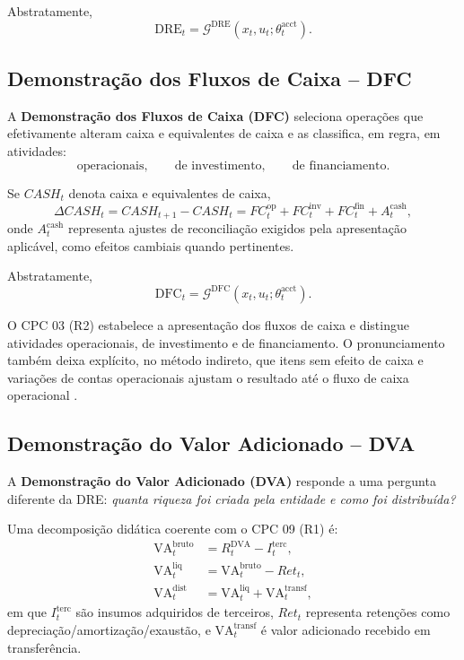 \documentclass[11pt,a4paper]{article}
\newcommand{\DRE}{\mathrm{DRE}}
\newcommand{\DFC}{\mathrm{DFC}}
\newcommand{\DVA}{\mathrm{DVA}}
\newcommand{\VA}{\mathrm{VA}}
\newcommand{\cG}{\mathcal{G}}
\begin{document}
Abstratamente,
\begin{equation}
\boxed{\DRE_t=\cG^{\DRE}(x_t,u_t;\theta_t^{\mathrm{acct}}).}
\end{equation}

\subsection{Demonstração dos Fluxos de Caixa -- DFC}

A \textbf{Demonstração dos Fluxos de Caixa (DFC)} seleciona operações que efetivamente alteram caixa e equivalentes de caixa e as classifica, em regra, em atividades:
\[
\text{operacionais},\qquad \text{de investimento},\qquad \text{de financiamento}.
\]

Se $CASH_t$ denota caixa e equivalentes de caixa,
\begin{equation}
\boxed{\Delta CASH_t=CASH_{t+1}-CASH_t
=FC_t^{\mathrm{op}}+FC_t^{\mathrm{inv}}+FC_t^{\mathrm{fin}}+A_t^{\mathrm{cash}},}
\label{eq:dfc}
\end{equation}
onde $A_t^{\mathrm{cash}}$ representa ajustes de reconciliação exigidos pela apresentação aplicável, como efeitos cambiais quando pertinentes.

Abstratamente,
\begin{equation}
\boxed{\DFC_t=\cG^{\DFC}(x_t,u_t;\theta_t^{\mathrm{acct}}).}
\end{equation}

\begin{fonte}
O CPC 03 (R2) estabelece a apresentação dos fluxos de caixa e distingue atividades operacionais, de investimento e de financiamento. O pronunciamento também deixa explícito, no método indireto, que itens sem efeito de caixa e variações de contas operacionais ajustam o resultado até o fluxo de caixa operacional \cite{CPC03}.
\end{fonte}

\subsection{Demonstração do Valor Adicionado -- DVA}

A \textbf{Demonstração do Valor Adicionado (DVA)} responde a uma pergunta diferente da DRE: \emph{quanta riqueza foi criada pela entidade e como foi distribuída?}

Uma decomposição didática coerente com o CPC 09 (R1) é:
\begin{align}
\VA_t^{\mathrm{bruto}} &= R_t^{\DVA}-I_t^{\mathrm{terc}},\\
\VA_t^{\mathrm{liq}} &= \VA_t^{\mathrm{bruto}}-Ret_t,\\
\VA_t^{\mathrm{dist}} &= \VA_t^{\mathrm{liq}}+\VA_t^{\mathrm{transf}},
\end{align}
em que $I_t^{\mathrm{terc}}$ são insumos adquiridos de terceiros, $Ret_t$ representa retenções como depreciação/amortização/exaustão, e $\VA_t^{\mathrm{transf}}$ é valor adicionado recebido em transferência.
\end{document}
